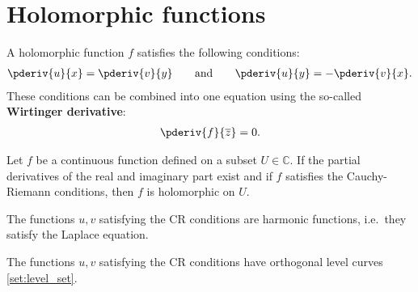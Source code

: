 \section{Holomorphic functions}


    \begin{property}\label{complex:cauchy_riemann}
        A holomorphic function $f$ satisfies the following conditions:
        \begin{gather}
            \pderiv{u}{x} = \pderiv{v}{y} \text{\qquad and\qquad} \pderiv{u}{y} = -\pderiv{v}{x}.
        \end{gather}
        These conditions can be combined into one equation using the so-called \textbf{Wirtinger derivative}:
        \begin{gather}
            \label{complex:holomorphic_alternative_condition}
            \pderiv{f}{\overline{z}} = 0.
        \end{gather}
    \end{property}

    \begin{theorem}
        Let $f$ be a continuous function defined on a subset $U\in\mathbb{C}$. If the partial derivatives of the real and imaginary part exist and if $f$ satisfies the Cauchy-Riemann conditions, then $f$ is holomorphic on $U$.
    \end{theorem}

    \begin{property}
        The functions $u,v$ satisfying the CR conditions are harmonic functions, i.e.~they satisfy the Laplace equation.
    \end{property}
    \begin{property}
        The functions $u,v$ satisfying the CR conditions have orthogonal level curves \ref{set:level_set}.
    \end{property}


